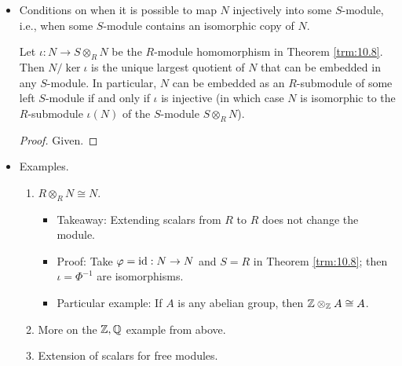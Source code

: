 \documentclass[../notes.tex]{subfiles}
\begin{document}
\begin{itemize}
\begin{theorem}
\begin{figure}[h!]
            \caption{Universal property of the tensor product.}
            \label{fig:univPropSotimesRN}
        \end{figure}
        Conversely, if $\Phi:S\otimes_RN\to L$ is an $S$-module homomorphism, then $\varphi=\Phi\circ\iota$ is an $R$-module homomorphism from $N$ to $L$.
        \begin{proof}
            Given.
        \end{proof}
    \end{theorem}
    \item Conditions on when it is possible to map $N$ injectively into some $S$-module, i.e., when some $S$-module contains an isomorphic copy of $N$.
    \begin{corollary}\label{cly:10.9}
        Let $\iota:N\to S\otimes_RN$ be the $R$-module homomorphism in Theorem \ref{trm:10.8}. Then $N/\ker\iota$ is the unique largest quotient of $N$ that can be embedded in any $S$-module. In particular, $N$ can be embedded as an $R$-submodule of some left $S$-module if and only if $\iota$ is injective (in which case $N$ is isomorphic to the $R$-submodule $\iota(N)$ of the $S$-module $S\otimes_RN$).
        \begin{proof}
            Given.
        \end{proof}
    \end{corollary}
    \item Examples.
    \begin{enumerate}
        \item $R\otimes_RN\cong N$.
        \begin{itemize}
            \item Takeaway: Extending scalars from $R$ to $R$ does not change the module.
            \item Proof: Take $\varphi=\operatorname{id}:N\to N$ and $S=R$ in Theorem \ref{trm:10.8}; then $\iota=\Phi^{-1}$ are isomorphisms.
            \item Particular example: If $A$ is any abelian group, then $\mathbb{Z}\otimes_{\mathbb{Z}} A\cong A$.
        \end{itemize}
        \item More on the $\mathbb{Z},\mathbb{Q}$ example from above.
        \item Extension of scalars for free modules.

\end{enumerate}
\end{itemize}
\end{document}
